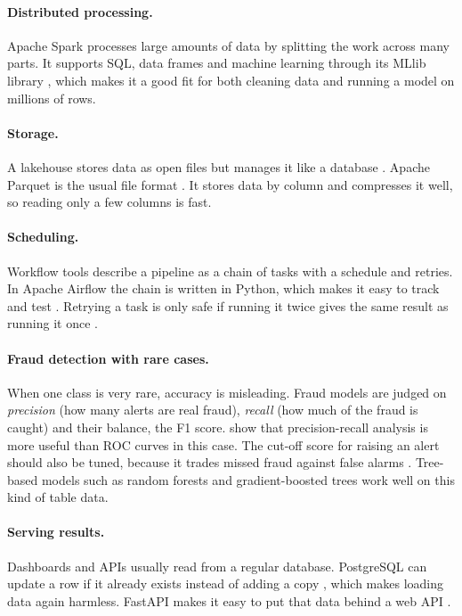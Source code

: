 \documentclass[11pt,a4paper]{article}
\begin{document}
\paragraph{Distributed processing.} Apache Spark processes large amounts of data
by splitting the work across many parts. It supports SQL, data frames and
machine learning through its MLlib library \citep{zaharia2016spark}, which makes
it a good fit for both cleaning data and running a model on millions of rows.

\paragraph{Storage.} A lakehouse stores data as open files but manages it like a
database \citep{armbrust2021lakehouse}. Apache Parquet is the usual file format
\citep{parquet}. It stores data by column and compresses it well, so reading
only a few columns is fast.

\paragraph{Scheduling.} Workflow tools describe a pipeline as a chain of tasks
with a schedule and retries. In Apache Airflow the chain is written in Python,
which makes it easy to track and test \citep{airflow}. Retrying a task is only
safe if running it twice gives the same result as running it once
\citep{kleppmann2017designing}.

\paragraph{Fraud detection with rare cases.} When one class is very rare,
accuracy is misleading. Fraud models are judged on \emph{precision} (how many
alerts are real fraud), \emph{recall} (how much of the fraud is caught) and
their balance, the F1 score. \citet{saito2015precision} show that
precision-recall analysis is more useful than ROC curves in this case. The cut-off
score for raising an alert should also be tuned, because it trades missed fraud
against false alarms \citep{dalpozzolo2015calibrating}. Tree-based models such as
random forests \citep{breiman2001random} and gradient-boosted trees
\citep{friedman2001greedy} work well on this kind of table data.

\paragraph{Serving results.} Dashboards and APIs usually read from a regular
database. PostgreSQL can update a row if it already exists instead of adding a
copy \citep{postgres}, which makes loading data again harmless. FastAPI makes it
easy to put that data behind a web API \citep{fastapi}.
\end{document}

